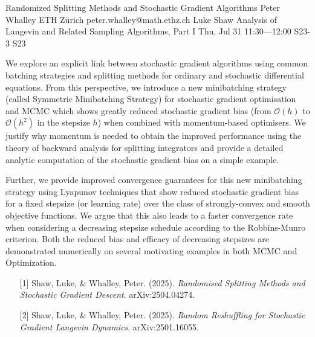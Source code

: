 \begin{talk}
  {Randomized Splitting Methods and Stochastic Gradient Algorithms}%
  {Peter Whalley}%
  {ETH Z\"{u}rich}%
  {peter.whalley@math.ethz.ch}%
  {Luke Shaw}%
  {Analysis of Langevin and Related Sampling Algorithms, Part I}%
  {Thu, Jul 31 11:30---12:00}%
  {S23-3}%
  {S23}%
    
   
We explore an explicit link between stochastic gradient algorithms using common batching strategies and splitting methods for ordinary and stochastic differential equations. From this perspective, we introduce a new minibatching strategy (called Symmetric Minibatching Strategy) for stochastic gradient optimisation and MCMC which shows greatly reduced stochastic gradient bias (from $\mathcal{O}(h)$ to $\mathcal{O}(h^{2})$ in the stepsize $h$) when combined with momentum-based optimisers. We justify why momentum is needed to obtain the improved performance using the theory of backward analysis for splitting integrators and provide a detailed analytic computation of the stochastic gradient bias on a simple example.

 

Further, we provide improved convergence guarantees for this new minibatching strategy using Lyapunov techniques that show reduced stochastic gradient bias for a fixed stepsize (or learning rate) over the class of strongly-convex and smooth objective functions. We argue that this also leads to a faster convergence rate when considering a decreasing stepsize schedule according to the Robbins-Munro criterion. Both the reduced bias and efficacy of decreasing stepsizes are demonstrated numerically on several motivating examples in both MCMC and Optimization.

\medskip

\begin{enumerate}
 \item[{[1]}] Shaw, Luke, \& Whalley, Peter. (2025). {\it Randomised Splitting Methods and Stochastic Gradient Descent}. arXiv:2504.04274.
 \item[{[2]}] Shaw, Luke, \& Whalley, Peter. (2025). {\it Random Reshuffling for Stochastic Gradient Langevin Dynamics}. arXiv:2501.16055.
\end{enumerate}

\end{talk}


